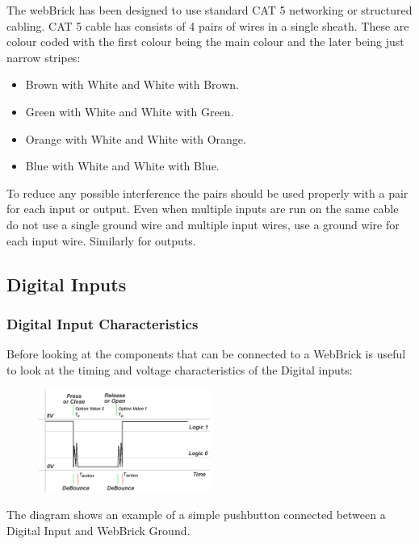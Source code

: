 The webBrick has been designed to use standard CAT 5 networking or structured cabling. CAT 5 cable has consists of 
4 pairs of wires in a single sheath.
These are colour coded with the first colour being the main colour and the later being just narrow stripes:

    \begin{itemize}
			\item Brown with White and White with Brown. 
			\item Green with White and White with Green. 
			\item Orange with White and White with Orange. 
			\item Blue with White and White with Blue. 
    \end{itemize}

To reduce any possible interference the pairs should be used properly with a pair for each 
input or output. Even when multiple inputs are run on the same cable do not use a single ground wire and multiple
input wires, use a ground wire for each input wire. Similarly for outputs.



\subsection{Digital Inputs}

	\subsubsection{Digital Input Characteristics}
	
		Before looking at the components that can be connected to a WebBrick is useful to look at the timing and voltage characteristics
		of the Digital inputs:
		
		    \begin{figure}[H]
		    \centering
		    \includegraphics[width=0.5\textwidth]{Images/DigitalInChar.png}
		    \end{figure}
		    
		The diagram shows an example of a simple pushbutton connected between a Digital Input and WebBrick Ground.
		
